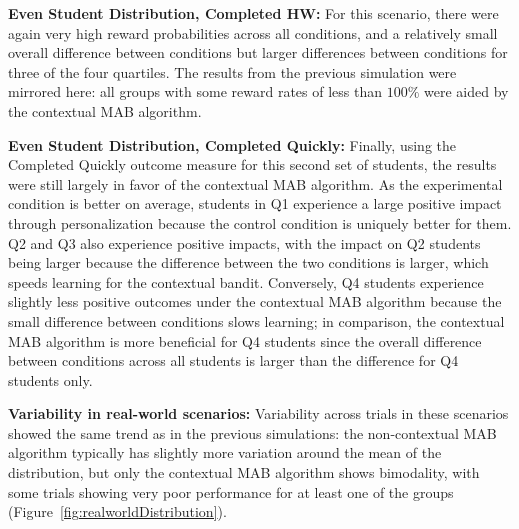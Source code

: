 \textbf{Even Student Distribution, Completed HW:} For this scenario, there were again very high reward probabilities across all conditions, and a relatively small overall difference between conditions but larger differences between conditions for three of the four quartiles. The results from the previous simulation were mirrored here: all groups with some reward rates of less than $100\%$ were aided by the contextual MAB algorithm.

\textbf{Even Student Distribution, Completed Quickly:} Finally, using the Completed Quickly outcome measure for this second set of students, the results were still largely in favor of the contextual MAB algorithm. As the experimental condition is better on average, students in Q1 experience a large positive impact through personalization because the control condition is uniquely better for them. Q2 and Q3 also experience positive impacts, with the impact on Q2 students being larger because the difference between the two conditions is larger, which speeds learning for the contextual bandit. Conversely, Q4 students experience slightly less positive outcomes under the contextual MAB algorithm because the small difference between conditions slows learning; in comparison, the contextual MAB algorithm is more beneficial for Q4 students since the overall difference between conditions across all students is larger than the difference for Q4 students only. 


\textbf{Variability in real-world scenarios:} Variability across trials in these scenarios showed the same trend as in the previous simulations: the non-contextual MAB algorithm typically has slightly more variation around the mean of the distribution, but only the contextual MAB algorithm shows bimodality, with some trials showing very poor performance for at least one of the groups (Figure~\ref{fig:realworldDistribution}). 




















